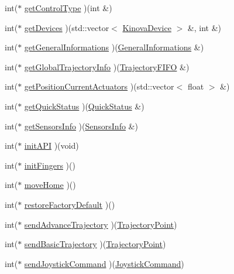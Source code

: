 \begin{DoxyCompactItemize}
\item 
int($\ast$ \hyperlink{classjaco_1_1JacoAPI_aff9218e13471d4d021f8144738c73ff1}{get\+Control\+Type} )(int \&)
\item 
int($\ast$ \hyperlink{classjaco_1_1JacoAPI_a6f80ab16b2518ecb0ddefcd7183027c1}{get\+Devices} )(std\+::vector$<$ \hyperlink{Kinova_8API_8CommLayerUbuntu_8h_da/dd6/structKinovaDevice}{Kinova\+Device} $>$ \&, int \&)
\item 
int($\ast$ \hyperlink{classjaco_1_1JacoAPI_ae1e29dcccd26e66e34271beff3a52f8c}{get\+General\+Informations} )(\hyperlink{KinovaTypes_8h_d2/d0f/structGeneralInformations}{General\+Informations} \&)
\item 
int($\ast$ \hyperlink{classjaco_1_1JacoAPI_a9638cf9678156df980370819dabd685e}{get\+Global\+Trajectory\+Info} )(\hyperlink{KinovaTypes_8h_d7/ddf/structTrajectoryFIFO}{Trajectory\+F\+I\+FO} \&)
\item 
int($\ast$ \hyperlink{classjaco_1_1JacoAPI_ac38d62b7adb611552bee71aa49f967b9}{get\+Position\+Current\+Actuators} )(std\+::vector$<$ float $>$ \&)
\item 
int($\ast$ \hyperlink{classjaco_1_1JacoAPI_ae4297fe364b296252a1c91efb9024b03}{get\+Quick\+Status} )(\hyperlink{KinovaTypes_8h_df/d9d/structQuickStatus}{Quick\+Status} \&)
\item 
int($\ast$ \hyperlink{classjaco_1_1JacoAPI_a390a9f4759fe2bd34a43634a17598638}{get\+Sensors\+Info} )(\hyperlink{structSensorsInfo}{Sensors\+Info} \&)
\item 
int($\ast$ \hyperlink{classjaco_1_1JacoAPI_a06eae62c9dd3e144cc4275048c3129e6}{init\+A\+PI} )(void)
\item 
int($\ast$ \hyperlink{classjaco_1_1JacoAPI_a2e57f45393bda81a7c7c91373a6c6359}{init\+Fingers} )()
\item 
int($\ast$ \hyperlink{classjaco_1_1JacoAPI_a3f3b46efd241e60665a70505fe1853af}{move\+Home} )()
\item 
int($\ast$ \hyperlink{classjaco_1_1JacoAPI_a64825b0563a56de02532a558ef902586}{restore\+Factory\+Default} )()
\item 
int($\ast$ \hyperlink{classjaco_1_1JacoAPI_a30abd0123d85582b684fbd86437d403c}{send\+Advance\+Trajectory} )(\hyperlink{structTrajectoryPoint}{Trajectory\+Point})
\item 
int($\ast$ \hyperlink{classjaco_1_1JacoAPI_acbaea3e47825b270d85d783c9f29d472}{send\+Basic\+Trajectory} )(\hyperlink{structTrajectoryPoint}{Trajectory\+Point})
\item 
int($\ast$ \hyperlink{classjaco_1_1JacoAPI_a57328804ef00fd40492ba065be3fe3f1}{send\+Joystick\+Command} )(\hyperlink{structJoystickCommand}{Joystick\+Command})

\end{DoxyCompactItemize}
